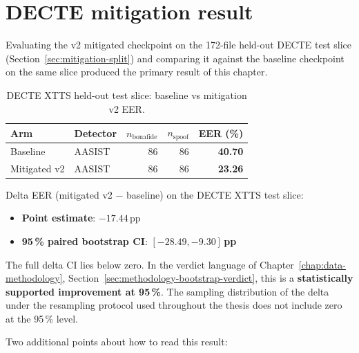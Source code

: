 \section{DECTE mitigation result}
\label{sec:mitigation-decte-result}

Evaluating the v2 mitigated checkpoint on the 172-file held-out
DECTE test slice (Section~\ref{sec:mitigation-split}) and comparing it against the
baseline checkpoint on the same slice produced the primary
result of this chapter.

\begin{table}[t]
\centering
\caption{DECTE XTTS held-out test slice: baseline vs mitigation v2 EER.}
\label{tab:mitigation-decte-v2}
\begin{tabularx}{\linewidth}{X l r r r}
\toprule
\textbf{Arm} & \textbf{Detector} & \textbf{$n_\text{bonafide}$} & \textbf{$n_\text{spoof}$} & \textbf{EER (\%)} \\
\midrule
Baseline     & AASIST & 86 & 86 & \textbf{40.70} \\
Mitigated v2 & AASIST & 86 & 86 & \textbf{23.26} \\
\bottomrule
\end{tabularx}
\end{table}

Delta EER (mitigated v2 $-$ baseline) on the DECTE XTTS test slice:

\begin{itemize}
    \item \textbf{Point estimate}: $-17.44$\,pp
    \item \textbf{95\,\% paired bootstrap CI}: $\mathbf{[-28.49, -9.30]}$\,\textbf{pp}
\end{itemize}

The full delta CI lies below zero. In the verdict language of
Chapter~\ref{chap:data-methodology}, Section~\ref{sec:methodology-bootstrap-verdict}, this is a \textbf{statistically supported
improvement at 95\,\%}. The sampling distribution of the delta
under the resampling protocol used throughout the thesis does
not include zero at the 95\,\% level.

Two additional points about how to read this result:

